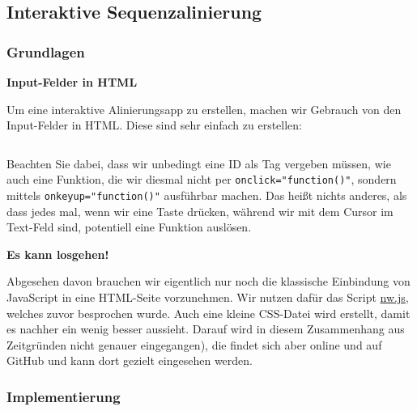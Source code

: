 \subsection{\texorpdfstring{{Interaktive
Sequenzalinierung}}{Interaktive Sequenzalinierung}}

\subsubsection{\texorpdfstring{{Grundlagen}}{Grundlagen}}

\vspace{0.5cm}\par\noindent\textbf{Input-Felder in HTML}\vspace{0.5cm}

Um eine interaktive Alinierungsapp zu erstellen, machen wir Gebrauch von
den Input-Felder in HTML. Diese sind sehr einfach zu erstellen:

\begin{verbatim}
\end{verbatim}

Beachten Sie dabei, dass wir unbedingt eine ID als Tag vergeben müssen,
wie auch eine Funktion, die wir diesmal nicht per
\texttt{onclick="function()"}, sondern mittels
\texttt{onkeyup="function()"} ausführbar machen. Das heißt nichts
anderes, als dass jedes mal, wenn wir eine Taste drücken, während wir
mit dem Cursor im Text-Feld sind, potentiell eine Funktion auslösen.



\vspace{0.5cm}\par\noindent\textbf{Es kann losgehen!}\vspace{0.5cm}

Abgesehen davon brauchen wir eigentlich nur noch die klassische
Einbindung von JavaScript in eine HTML-Seite vorzunehmen. Wir nutzen
dafür das Script
\href{https://github.com/LinguList/pyjs-seminar/blob/master/website/code/nw.js}{nw.js},
welches zuvor besprochen wurde. Auch eine kleine CSS-Datei wird
erstellt, damit es nachher ein wenig besser aussieht. Darauf wird in
diesem Zusammenhang aus Zeitgründen nicht genauer eingegangen), die
findet sich aber online und auf GitHub und kann dort gezielt eingesehen
werden.


\subsubsection{\texorpdfstring{{Implementierung}}{Implementierung}}

